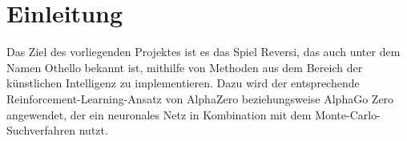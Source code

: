 \section{Einleitung}
Das Ziel des vorliegenden Projektes ist es das Spiel \glqq{}Reversi\grqq{}, das auch unter dem Namen \glqq{}Othello\grqq{} bekannt ist, mithilfe von Methoden aus dem Bereich der künstlichen Intelligenz zu implementieren. Dazu wird der entsprechende Reinforcement-Learning-Ansatz von AlphaZero beziehungsweise AlphaGo Zero angewendet, der ein neuronales Netz in Kombination mit dem Monte-Carlo-Suchverfahren nutzt.



